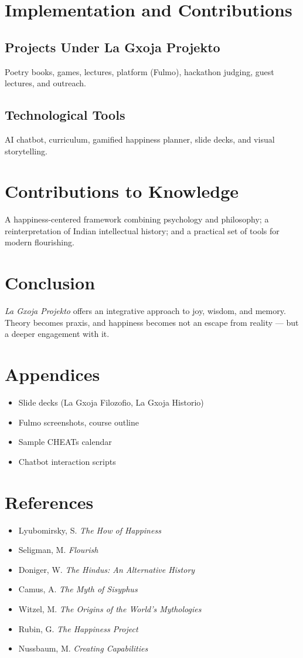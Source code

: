 \documentclass[12pt]{article}
\begin{document}
\section{Implementation and Contributions}
\subsection{Projects Under La Gxoja Projekto}
Poetry books, games, lectures, platform (Fulmo), hackathon judging, guest lectures, and outreach.

\subsection{Technological Tools}
AI chatbot, curriculum, gamified happiness planner, slide decks, and visual storytelling.

\section{Contributions to Knowledge}
A happiness-centered framework combining psychology and philosophy; a reinterpretation of Indian intellectual history; and a practical set of tools for modern flourishing.

\section{Conclusion}
\textit{La Gxoja Projekto} offers an integrative approach to joy, wisdom, and memory. Theory becomes praxis, and happiness becomes not an escape from reality — but a deeper engagement with it.

\section*{Appendices}
\begin{itemize}[leftmargin=*, label=--]
  \item Slide decks (La Gxoja Filozofio, La Gxoja Historio)
  \item Fulmo screenshots, course outline
  \item Sample CHEATs calendar
  \item Chatbot interaction scripts
\end{itemize}

\section*{References}
\begin{itemize}[leftmargin=*, label=--]
  \item Lyubomirsky, S. \textit{The How of Happiness}
  \item Seligman, M. \textit{Flourish}
  \item Doniger, W. \textit{The Hindus: An Alternative History}
  \item Camus, A. \textit{The Myth of Sisyphus}
  \item Witzel, M. \textit{The Origins of the World’s Mythologies}
  \item Rubin, G. \textit{The Happiness Project}
  \item Nussbaum, M. \textit{Creating Capabilities}
\end{itemize}
\end{document}
